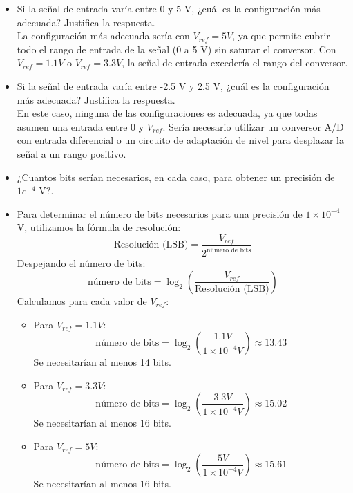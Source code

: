 \documentclass[10pt,twoside,spanish,a4paper]{article}
\begin{document}
\begin{itemize}
\begin{itemize}
			Con $V_{ref} = 1.1 V$, la señal de entrada excedería el rango del conversor, y con $V_{ref} = 5 V$, la resolución sería menor.
			\item Si la señal de entrada varía entre 0 y 5 V, ¿cuál es la configuración más adecuada? Justifica la respuesta.\\
			La configuración más adecuada sería con $V_{ref} = 5 V$, ya que permite cubrir todo el rango de entrada de la señal (0 a 5 V) sin saturar el conversor.
			Con $V_{ref} = 1.1 V$ o $V_{ref} = 3.3 V$, la señal de entrada excedería el rango del conversor.
			\item Si la señal de entrada varía entre -2.5 V y 2.5 V, ¿cuál es la configuración más adecuada? Justifica la respuesta.\\
			En este caso, ninguna de las configuraciones es adecuada, ya que todas asumen una entrada entre 0 y $V_{ref}$.
			Sería necesario utilizar un conversor A/D con entrada diferencial o un circuito de adaptación de nivel para desplazar la señal a un rango positivo.
			\item ¿Cuantos bits serían necesarios, en cada caso, para obtener un precisión de $1e^{-4}$ V?.
			\item Para determinar el número de bits necesarios para una precisión de $1 \times 10^{-4}$ V, utilizamos la fórmula de resolución:
			\[ \text{Resolución (LSB)} = \frac{V_{ref}}{2^{\text{número de bits}}} \]
			Despejando el número de bits:
			\[ \text{número de bits} = \log_2\left(\frac{V_{ref}}{\text{Resolución (LSB)}}\right) \]
			Calculamos para cada valor de $V_{ref}$:
			\begin{itemize}
				\item Para $V_{ref} = 1.1 V$:
				\[ \text{número de bits} = \log_2\left(\frac{1.1 V}{1 \times 10^{-4} V}\right) \approx 13.43 \]
				Se necesitarían al menos 14 bits.
				\item Para $V_{ref} = 3.3 V$:
				\[ \text{número de bits} = \log_2\left(\frac{3.3 V}{1 \times 10^{-4} V}\right) \approx 15.02 \]
				Se necesitarían al menos 16 bits.
				\item Para $V_{ref} = 5 V$:
				\[ \text{número de bits} = \log_2\left(\frac{5 V}{1 \times 10^{-4} V}\right) \approx 15.61 \]
				Se necesitarían al menos 16 bits.
			\end{itemize}
		\end{itemize}

	\end{itemize}
\end{document}
